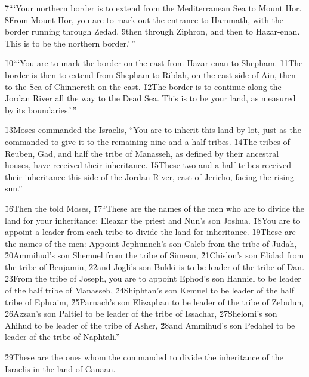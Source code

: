 \v{7}```Your northern border is to extend from the Mediterranean Sea to Mount Hor. \v{8}From Mount Hor, you are to mark out the entrance to Hammath, with the border running through Zedad, \v{9}then through Ziphron, and then to Hazar-enan. This is to be the northern border.'\,''

\v{10}```You are to mark the border on the east from Hazar-enan to Shepham. \v{11}The border is then to extend from Shepham to Riblah, on the east side of Ain, then to the Sea of Chinnereth on the east. \v{12}The border is to continue along the Jordan River all the way to the Dead Sea. This is to be your land, as measured by its boundaries.'\,''

\v{13}Moses commanded the Israelis, ``You are to inherit this land by lot, just as the  commanded to give it to the remaining nine and a half tribes. \v{14}The tribes of Reuben, Gad, and half the tribe of Manasseh, as defined by their ancestral houses, have received their inheritance. \v{15}These two and a half tribes received their inheritance this side of the Jordan River, east of Jericho, facing the rising sun.''

\v{16}Then the  told Moses, \v{17}``These are the names of the men who are to divide the land for your inheritance: Eleazar the priest and Nun's son Joshua. \v{18}You are to appoint a leader from each tribe to divide the land for inheritance. \v{19}These are the names of the men: Appoint Jephunneh's son Caleb from the tribe of Judah, \v{20}Ammihud's son Shemuel from the tribe of Simeon, \v{21}Chislon's son Elidad from the tribe of Benjamin, \v{22}and Jogli's son Bukki is to be leader of the tribe of Dan. \v{23}From the tribe of Joseph, you are to appoint Ephod's son Hanniel to be leader of the half tribe of Manasseh, \v{24}Shiphtan's son Kemuel to be leader of the half tribe of Ephraim, \v{25}Parnach's son Elizaphan to be leader of the tribe of Zebulun, \v{26}Azzan's son Paltiel to be leader of the tribe of Issachar, \v{27}Shelomi's son Ahihud to be leader of the tribe of Asher, \v{28}and Ammihud's son Pedahel to be leader of the tribe of Naphtali.''

\v{29}These are the ones whom the  commanded to divide the inheritance of the Israelis in the land of Canaan.

